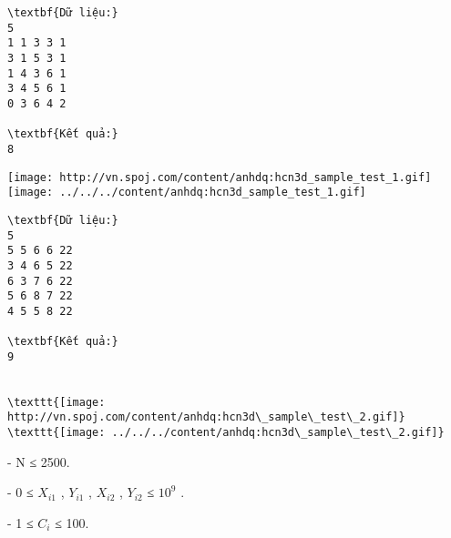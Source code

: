 \begin{verbatim}
\textbf{Dữ liệu:}
5
1 1 3 3 1
3 1 5 3 1
1 4 3 6 1
3 4 5 6 1
0 3 6 4 2

\textbf{Kết quả:}
8
\end{verbatim}


\texttt{[image: http://vn.spoj.com/content/anhdq:hcn3d\_sample\_test\_1.gif]}
\texttt{[image: ../../../content/anhdq:hcn3d\_sample\_test\_1.gif]}
\begin{verbatim}
\textbf{Dữ liệu:}
5
5 5 6 6 22
3 4 6 5 22
6 3 7 6 22
5 6 8 7 22
4 5 5 8 22

\textbf{Kết quả:}
9


\texttt{[image: http://vn.spoj.com/content/anhdq:hcn3d\_sample\_test\_2.gif]}
\texttt{[image: ../../../content/anhdq:hcn3d\_sample\_test\_2.gif]}\end{verbatim}
- N ≤ 2500.


- 0 ≤ $X_{i1}$ , $Y_{i1}$ , $X_{i2}$ , $Y_{i2}$ ≤ $10^{9}$ .


- 1 ≤ $C_{i}$ ≤ 100.